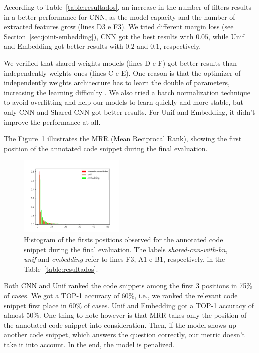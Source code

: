 \documentclass[sigconf]{acmart}
\begin{document}
According to Table~\ref{table:resultados}, an increase in the number of filters results in a better performance for CNN, as the model capacity and the number of extracted features grow (lines D3 e F3). 
We tried different margin loss (see Section~\ref{sec:joint-embedding}), CNN got the best results with  $0.05$, while Unif and Embedding got better results with $0.2$ and $0.1$, respectively. 


We verified that shared weights models (lines D e F) got better results than independently weights ones (lines C e E). One reason is that the optimizer of independently weights architecture has to learn the double of parameters, increasing the learning difficulty \cite{feng-2015}. We also tried a batch normalization technique to avoid overfitting and help our models to learn quickly and more stable, but only CNN and Shared CNN got better results. For Unif and Embedding, it didn't improve the performance at all. 

The Figure~\ref{fig:histogram-mrr} illustrates the MRR (Mean Reciprocal Rank), showing the first position of the annotated code snippet during the final evaluation.

\begin{figure}[H]
    \centering
    \includegraphics[width=0.45\textwidth]{figuras/histogram.pdf}
    \caption{Histogram of the firsts positions observed for the annotated code snippet during the final evaluation. The labels \emph{shared-cnn-with-bn}, \emph{unif} and \emph{embedding} refer to lines F3, A1 e B1, respectively, in the Table~\ref{table:resultados}.}
    \label{fig:histogram-mrr}
\end{figure}


Both CNN and Unif ranked the code snippets among the first 3 positions in 75\% of cases. We got a TOP-1 accuracy of 60\%, i.e., we ranked the relevant code snippet first place in 60\% of cases. Unif and Embedding got a TOP-1 accuracy of almost 50\%. One thing to note however is that MRR takes only the position of the annotated code snippet into consideration. Then, if the model shows up another code snippet, which answers the question correctly, our metric doesn't take it into account. In the end, the model is penalized. 
\end{document}

